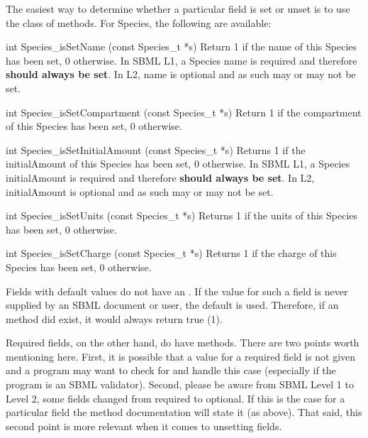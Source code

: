 \documentclass{cekmanual}
\begin{document}
The easiest way to determine whether a particular field is set or
unset is to use the  class of methods.  For
Species, the following are available:


\begin{methoddef}{int Species\_isSetName (const Species\_t *s)}
  Return 1 if the name of this Species has been set, 0 otherwise.  In
  SBML L1, a Species name is required and therefore \textbf{should
  always be set}.  In L2, name is optional and as such may or may not
  be set.
\end{methoddef}

\begin{methoddef}{int Species\_isSetCompartment (const Species\_t *s)}
  Return 1 if the compartment of this Species has been set, 0 otherwise.
\end{methoddef}

\begin{methoddef}{int Species\_isSetInitialAmount (const Species\_t *s)}
  Returns 1 if the initialAmount of this Species has been set, 0
  otherwise.  In SBML L1, a Species initialAmount is required and
  therefore \textbf{should always be set}.  In L2, initialAmount is
  optional and as such may or may not be set.
\end{methoddef}

\begin{methoddef}{int Species\_isSetUnits (const Species\_t *s)}
  Returns 1 if the units of this Species has been set, 0 otherwise.
\end{methoddef}

\begin{methoddef}{int Species\_isSetCharge (const Species\_t *s)}
  Returns 1 if the charge of this Species has been set, 0 otherwise.
\end{methoddef}


Fields with default values do not have an .  If the
value for such a field is never supplied by an SBML document or user,
the default is used. Therefore, if an  method did
exist, it would always return true (1).

Required fields, on the other hand, do have 
methods.  There are two points worth mentioning here.  First, it is
possible that a value for a required field is not given and a program
may want to check for and handle this case (especially if the program
is an SBML validator).  Second, please be aware from SBML Level 1 to
Level 2, some fields changed from required to optional.  If this is
the case for a particular field the method documentation will state it
(as above).  That said, this second point is more relevant when it
comes to unsetting fields.
\end{document}
